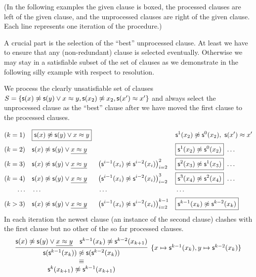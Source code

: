 (In the following examples the given clause is boxed,
the processed clauses are left of the given clause,
and the unprocessed clauses are right of the given clause.
Each line represents one iteration of the procedure.)

A crucial part is the selection of the “best” unprocessed clause.
At least we have to ensure that any (non-redundant) clause is selected eventually.
Otherwise we may stay in a satisfiable subset of the set of clauses
as we demonstrate in the following silly example with respect to resolution.
\begin{example}
	We process the clearly unsatisfiable set of clauses
	\( S = \{
		\mathsf{s}(x)\not\approx \mathsf{s}(y)\lor {x\approx y},
		\mathsf{s}(x_2)\not\approx x_2, \mathsf{s}(x')\approx x'
		\} \)
	and always select the  unprocessed clause as the “best” clause
	after we have moved the first clause to the processed clauses.

	\begin{align*}
		(k=1)\quad
		&\boxed{\mathsf{s}(x)\not\approx \mathsf{s}(y)\lor {x\approx y}} &
		&&
		&{ \mathsf{s}^1(x_2)\not\approx \mathsf{s}^0(x_2) },\ { \mathsf{s}(x')\approx x' }
		\\
		(k=2)\quad
		&\mathsf{s}(x)\not\approx \mathsf{s}(y)\lor \underline{x\approx y} &
		&&
		&\boxed{ \mathsf{s}^1(x_2)\not\approx \mathsf{s}^0(x_2) }\ \ldots
		\\
		(k=3)\quad
		&\mathsf{s}(x)\not\approx \mathsf{s}(y)\lor \underline{x\approx y} &
		&{\left(\mathsf{s}^{i-1}(x_{i})\not\approx \mathsf{s}^{i-2}(x_{i})\right)}_{i=2}^{2} &
		&\boxed{ \mathsf{s}^2(x_3)\not\approx \mathsf{s}^1(x_3) }\ \ldots
		\\
		(k=4)\quad
		&\mathsf{s}(x)\not\approx \mathsf{s}(y)\lor \underline{x\approx y} &
		&{\left(\mathsf{s}^{i-1}(x_{i})\not\approx \mathsf{s}^{i-2}(x_{i})\right)}_{i=2}^{3} &
		&\boxed{ \mathsf{s}^3(x_4)\not\approx \mathsf{s}^2(x_4) }\ \ldots
		\\
		\cdots\quad & \cdots && \cdots && \cdots
		\\
		(k>3)\quad
		&\mathsf{s}(x)\not\approx \mathsf{s}(y)\lor \underline{x\approx y} &
		&{\left(\mathsf{s}^{i-1}(x_{i})\not\approx \mathsf{s}^{i-2}(x_{i})\right)}_{i=2}^{k-1} &
		&\boxed{ \mathsf{s}^{k-1}(x_{k})\not\approx \mathsf{s}^{k-2}(x_{k}) }
		\end{align*}
		In each iteration the newest clause
		(an instance of the second clause)
		clashes with the first clause but no other of the so far processed clauses.
		\begin{gather*}
			\infer[
				\{x\mapsto\msucc^{k-1}(x_{k}),
				y\mapsto\msucc^{k-2}(x_{k})\}
				]{
					\begin{array}{c}
					\msucc(\msucc^{k-1}(x_{k}))\mNE \msucc(\msucc^{k-2}(x_{k}))
					\\ \equiv \\
					\msucc^{k}(x_{k+1})\mNE \msucc^{k-1}(x_{k+1})
					\end{array}
				}{
				\msucc(x)\mNE \msucc(y)\lor \underline{x\mEQ y} &
				\msucc^{k-1}(x_{k})\mNE \msucc^{k-2}(x_{k+1})
			}
		\end{gather*}
\end{example}



